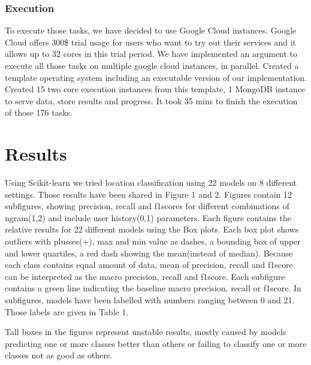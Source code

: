 \documentclass[twoside,11pt]{article}
\begin{document}
\subsubsection{Execution}
To execute those tasks, we have decided to use Google Cloud instances. Google Cloud offers 300\$ trial usage for users who want to try out their services and it allows up to 32 cores in this trial period. We have implemented an argument to execute all those tasks on multiple google cloud instances, in parallel. Created a template operating system including an executable version of our implementation. Created 15 two core execution instances from this template, 1 MongoDB instance to serve data, store results and progress. It took 35 mins to finish the execution of those 176 tasks. 


\section{Results}
Using Scikit-learn\cite{scikit-learn} we tried location classification using 22 models on 8 different settings. Those results have been shared in Figure 1 and 2. Figures contain 12 subfigures, showing precision, recall and f1scores for different combinations of ngram(1,2) and include user history(0,1) parameters. Each figure contains the relative results for 22 different models using the Box plots\cite{mcgill1978variations}. Each box plot shows outliers with plusses(+), max and min value as dashes, a bounding box of upper and lower quartiles, a red dash showing the mean(instead of median). Because each class contains equal amount of data, mean of precision, recall and f1score can be interpreted as the macro precision, recall and f1score. Each subfigure contains a green line indicating the baseline macro precision, recall or f1score. In subfigures, models have been labelled with numbers ranging between 0 and 21. Those labels are given in Table 1. 

Tall boxes in the figures represent unstable results, mostly caused by models predicting one or more classes better than others or failing to classify one or more classes not as good as others.
\end{document}
